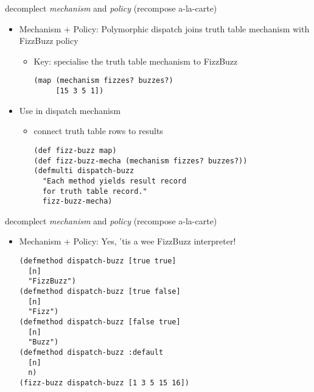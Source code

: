 \documentclass[presentation]{beamer}
\begin{document}
\begin{frame}[label={sec:org46a9058},fragile]{decomplect \emph{mechanism} and \emph{policy} (recompose a-la-carte)}
 \begin{itemize}
\item \alert{Mechanism + Policy}: Polymorphic dispatch joins
truth table mechanism with FizzBuzz policy
\begin{itemize}
\item Key: specialise the truth table mechanism to FizzBuzz
\begin{verbatim}
(map (mechanism fizzes? buzzes?)
     [15 3 5 1])
\end{verbatim}
\end{itemize}
\item Use in dispatch mechanism
\begin{itemize}
\item connect truth table rows to results
\begin{verbatim}
(def fizz-buzz map)
(def fizz-buzz-mecha (mechanism fizzes? buzzes?))
(defmulti dispatch-buzz
  "Each method yields result record
  for truth table record."
  fizz-buzz-mecha)
\end{verbatim}
\end{itemize}
\end{itemize}
\end{frame}
\begin{frame}[label={sec:orge4cc296},fragile]{decomplect \emph{mechanism} and \emph{policy} (recompose a-la-carte)}
 \begin{itemize}
\item \alert{Mechanism + Policy}: Yes, 'tis a wee FizzBuzz interpreter!
\begin{verbatim}
(defmethod dispatch-buzz [true true]
  [n]
  "FizzBuzz")
(defmethod dispatch-buzz [true false]
  [n]
  "Fizz")
(defmethod dispatch-buzz [false true]
  [n]
  "Buzz")
(defmethod dispatch-buzz :default
  [n]
  n)
(fizz-buzz dispatch-buzz [1 3 5 15 16])
\end{verbatim}
\end{itemize}
\end{frame}
\end{document}

